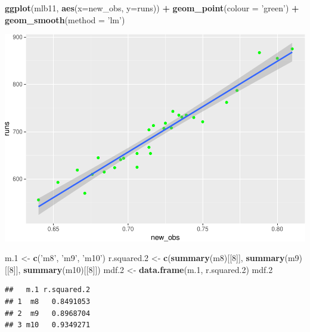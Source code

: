 \documentclass[]{article}
\newenvironment{Shaded}{\begin{snugshade}}{\end{snugshade}}
\newcommand{\KeywordTok}[1]{\textcolor[rgb]{0.13,0.29,0.53}{\textbf{#1}}}
\newcommand{\DataTypeTok}[1]{\textcolor[rgb]{0.13,0.29,0.53}{#1}}
\newcommand{\DecValTok}[1]{\textcolor[rgb]{0.00,0.00,0.81}{#1}}
\newcommand{\StringTok}[1]{\textcolor[rgb]{0.31,0.60,0.02}{#1}}
\newcommand{\OperatorTok}[1]{\textcolor[rgb]{0.81,0.36,0.00}{\textbf{#1}}}
\newcommand{\NormalTok}[1]{#1}
\begin{document}
\begin{Shaded}
\begin{Highlighting}[]
\KeywordTok{ggplot}\NormalTok{(mlb11, }\KeywordTok{aes}\NormalTok{(}\DataTypeTok{x=}\NormalTok{new_obs, }\DataTypeTok{y=}\NormalTok{runs)) }\OperatorTok{+}
\StringTok{  }\KeywordTok{geom_point}\NormalTok{(}\DataTypeTok{colour =} \StringTok{'green'}\NormalTok{) }\OperatorTok{+}
\StringTok{  }\KeywordTok{geom_smooth}\NormalTok{(}\DataTypeTok{method =} \StringTok{'lm'}\NormalTok{)}
\end{Highlighting}
\end{Shaded}

\includegraphics{DATA_606_Lab_7_files/figure-latex/unnamed-chunk-3-3.pdf}

\begin{Shaded}
\begin{Highlighting}[]
\NormalTok{m.}\DecValTok{1}\NormalTok{ <-}\StringTok{ }\KeywordTok{c}\NormalTok{(}\StringTok{'m8'}\NormalTok{, }\StringTok{'m9'}\NormalTok{, }\StringTok{'m10'}\NormalTok{)}
\NormalTok{r.squared.}\DecValTok{2}\NormalTok{ <-}\StringTok{ }\KeywordTok{c}\NormalTok{(}\KeywordTok{summary}\NormalTok{(m8)[[}\DecValTok{8}\NormalTok{]], }\KeywordTok{summary}\NormalTok{(m9)[[}\DecValTok{8}\NormalTok{]], }\KeywordTok{summary}\NormalTok{(m10)[[}\DecValTok{8}\NormalTok{]])}
\NormalTok{mdf.}\DecValTok{2}\NormalTok{ <-}\StringTok{ }\KeywordTok{data.frame}\NormalTok{(m.}\DecValTok{1}\NormalTok{, r.squared.}\DecValTok{2}\NormalTok{)}
\NormalTok{mdf.}\DecValTok{2}
\end{Highlighting}
\end{Shaded}

\begin{verbatim}
##   m.1 r.squared.2
## 1  m8   0.8491053
## 2  m9   0.8968704
## 3 m10   0.9349271
\end{verbatim}
\end{document}
